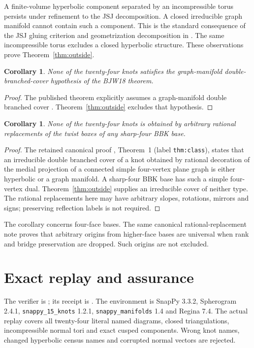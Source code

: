 \documentclass[11pt]{article}
\newtheorem{corollary}[theorem]{Corollary}
\begin{document}
A finite-volume hyperbolic component separated by an incompressible
torus persists under refinement to the JSJ decomposition.
A closed irreducible graph manifold cannot contain such a component.
This is the standard consequence of the JSJ gluing criterion and
geometrization decomposition in
\cite[Proposition~1.6.2 and Theorem~1.7.6]{afw}.
The same incompressible torus excludes a closed hyperbolic structure.
These observations prove Theorem~\ref{thm:outside}.

\begin{corollary}\label{cor:bjw}
None of the twenty-four knots satisfies the graph-manifold
double-branched-cover hypothesis of the BJW18 theorem.
\end{corollary}
\begin{proof}
The published theorem explicitly assumes a graph-manifold double
branched cover \cite[Theorem~1.2]{bjw}.
Theorem~\ref{thm:outside} excludes that hypothesis.
\end{proof}

\begin{corollary}\label{cor:rational}
None of the twenty-four knots is obtained by arbitrary rational
replacements of the twist boxes of any sharp-four BBK base.
\end{corollary}
\begin{proof}
The retained canonical proof
, Theorem~1
(label \texttt{thm:class}), states that an irreducible double
branched cover of a knot obtained by rational decoration of the medial
projection of a connected simple four-vertex plane graph is either
hyperbolic or a graph manifold.
A sharp-four BBK base has such a simple four-vertex dual.
Theorem~\ref{thm:outside} supplies an irreducible cover of neither type.
The rational replacements here may have arbitrary slopes, rotations,
mirrors and signs; preserving reflection labels is not required.
\end{proof}

The corollary concerns four-face bases.
The same canonical rational-replacement note proves that arbitrary
origins from higher-face bases are universal when rank and bridge
preservation are dropped. Such origins are not excluded.

\section{Exact replay and assurance}

The verifier is ;
its receipt is .
The environment is SnapPy 3.3.2, Spherogram 2.4.1,
\texttt{snappy\_15\_knots} 1.2.1,
\texttt{snappy\_manifolds} 1.4 and Regina 7.4.
The actual replay covers all twenty-four literal named diagrams,
closed triangulations, incompressible normal tori and exact cusped
components. Wrong knot names, changed hyperbolic census names and
corrupted normal vectors are rejected.
\end{document}
